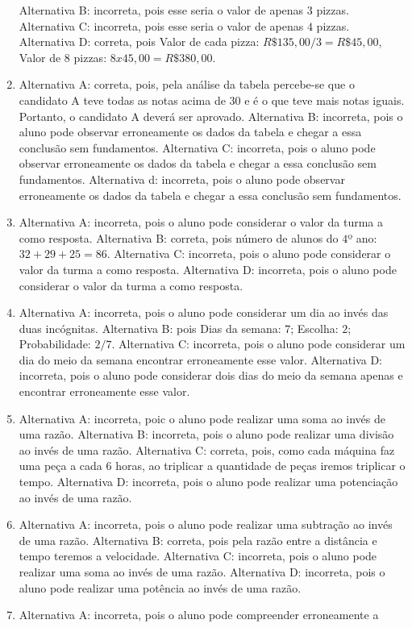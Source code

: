\begin{enumerate}
Alternativa B: incorreta, pois esse seria o valor de apenas $3$ pizzas.
Alternativa C: incorreta, pois esse seria o valor de apenas $4$ pizzas.
Alternativa D: correta, pois Valor de cada pizza: $R\$135,00/3 = R\$
45,00$, Valor de $8$ pizzas: $8 x 45,00 = R\$380,00$.
\item Alternativa A: correta, pois, pela análise da tabela percebe-se que o
candidato A teve todas as notas acima de $30$ e é o que teve mais notas
iguais. Portanto, o candidato A deverá ser aprovado.
Alternativa B: incorreta, pois o aluno pode observar erroneamente os
dados da tabela e chegar a essa conclusão sem fundamentos.
Alternativa C: incorreta, pois o aluno pode observar erroneamente os
dados da tabela e chegar a essa conclusão sem fundamentos.
Alternativa d: incorreta, pois o aluno pode observar erroneamente os
dados da tabela e chegar a essa conclusão sem fundamentos.
\item Alternativa A: incorreta, pois o aluno pode considerar o valor da turma
a como resposta.
Alternativa B: correta, pois número de alunos do $4$º ano: $32 + 29 + 25 = 86$.
Alternativa C: incorreta, pois o aluno pode considerar o valor da turma
a como resposta.
Alternativa D: incorreta, pois o aluno pode considerar o valor da turma
a como resposta.
\item Alternativa A: incorreta, pois o aluno pode considerar um dia ao invés
das duas incógnitas.
Alternativa B: pois Dias da semana: $7$; Escolha: $2$; Probabilidade: $2/7$.
Alternativa C: incorreta, pois o aluno pode considerar um dia do meio da
semana encontrar erroneamente esse valor.
Alternativa D: incorreta, pois o aluno pode considerar dois dias do meio
da semana apenas e encontrar erroneamente esse valor.
\item Alternativa A: incorreta, poic o aluno pode realizar uma soma ao invés
de uma razão.
Alternativa B: incorreta, pois o aluno pode realizar uma divisão ao
invés de uma razão.
Alternativa C: correta, pois, como cada máquina faz uma peça a cada $6$
horas, ao triplicar a quantidade de peças iremos triplicar o tempo.
Alternativa D: incorreta, pois o aluno pode realizar uma potenciação ao
invés de uma razão.
\item Alternativa A: incorreta, pois o aluno pode realizar uma subtração ao
invés de uma razão.
Alternativa B: correta, pois pela razão entre a distância e tempo
teremos a velocidade.
Alternativa C: incorreta, pois o aluno pode realizar uma soma ao invés
de uma razão.
Alternativa D: incorreta, pois o aluno pode realizar uma potência ao
invés de uma razão.
\item Alternativa A: incorreta, pois o aluno pode compreender erroneamente a

\end{enumerate}
